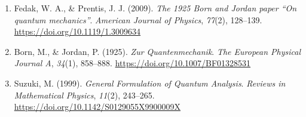 {\begin{enumerate}
		\item Fedak, W. A., \& Prentis, J. J. (2009). \textit{The 1925 Born and Jordan paper ``On quantum mechanics''}. \textit{American Journal of Physics}, \textit{77}(2), 128--139. \url{https://doi.org/10.1119/1.3009634}
		
		\item Born, M., \& Jordan, P. (1925). \textit{Zur Quantenmechanik}. \textit{The European Physical Journal A}, \textit{34}(1), 858--888. \url{https://doi.org/10.1007/BF01328531}
		
		\item Suzuki, M. (1999). \textit{General Formulation of Quantum Analysis}. \textit{Reviews in Mathematical Physics}, \textit{11}(2), 243--265. \url{https://doi.org/10.1142/S0129055X9900009X}
	\end{enumerate}}